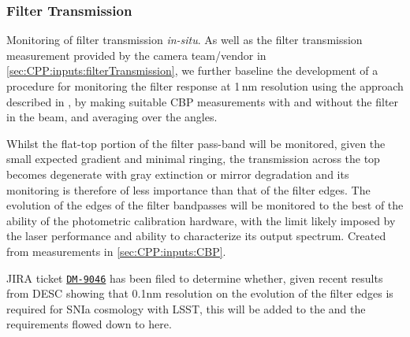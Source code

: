 \subsubsection{Filter Transmission}\label{sec:CPP:output:filterTransmission}
Monitoring of filter transmission \emph{in-situ}. As well as the filter transmission measurement provided by the camera team/vendor in \secsymbol\ref{sec:CPP:inputs:filterTransmission}, we further baseline the development of a procedure for monitoring the filter response at 1\,nm resolution using the approach described in \cite{Lupton15}, \ie by making suitable CBP measurements with and without the filter in the beam, and averaging over the angles.

Whilst the flat-top portion of the filter pass-band will be monitored, given the small expected gradient and minimal ringing, the transmission across the top becomes degenerate with gray extinction or mirror degradation and its monitoring is therefore of less importance than that of the filter edges. The evolution of the edges of the filter bandpasses will be monitored to the best of the ability of the photometric calibration hardware, with the limit likely imposed by the laser performance and ability to characterize its output spectrum.
\alg Created from measurements in \secsymbol\ref{sec:CPP:inputs:CBP}.

\begin{note}
	JIRA ticket \hyperref{https://jira.lsstcorp.org/browse/DM-9046}{}{}{\texttt{DM-9046}} has been filed to determine whether, given recent results from DESC showing that 0.1nm resolution on the evolution of the filter edges is required for SNIa cosmology with LSST, this will be added to the \SRD and the requirements flowed down to here.
\end{note}



